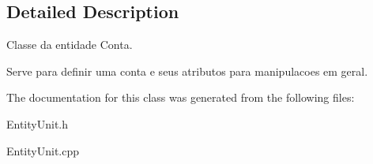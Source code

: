 \subsection{Detailed Description}
Classe da entidade Conta. 

Serve para definir uma conta e seus atributos para manipulacoes em geral. 

The documentation for this class was generated from the following files\-:\begin{DoxyCompactItemize}
\item 
Entity\-Unit.\-h\item 
Entity\-Unit.\-cpp\end{DoxyCompactItemize}
